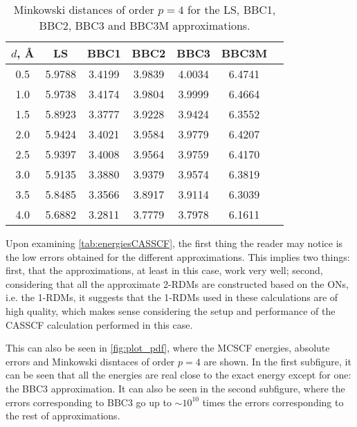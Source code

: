     \begin{table}[b!]
        \caption{Minkowski distances of order $p = 4$ for the LS, BBC1, BBC2, BBC3
        and BBC3M approximations.}
        \label{tab:minkowski}
        \centering
        \begin{tabular}{@{}ccccccc@{}}
            \toprule
            $d$, \AA    & LS       & BBC1     & BBC2     & BBC3     & BBC3M    \\
            \midrule
            0.5   & 5.9788   & 3.4199   & 3.9839   & 4.0034   & 6.4741   \\
            1.0   & 5.9738   & 3.4174   & 3.9804   & 3.9999   & 6.4664   \\
            1.5   & 5.8923   & 3.3777   & 3.9228   & 3.9424   & 6.3552   \\
            2.0   & 5.9424   & 3.4021   & 3.9584   & 3.9779   & 6.4207   \\
            2.5   & 5.9397   & 3.4008   & 3.9564   & 3.9759   & 6.4170   \\
            3.0   & 5.9135   & 3.3880   & 3.9379   & 3.9574   & 6.3819   \\
            3.5   & 5.8485   & 3.3566   & 3.8917   & 3.9114   & 6.3039   \\
            4.0   & 5.6882   & 3.2811   & 3.7779   & 3.7978   & 6.1611   \\
            \bottomrule
        \end{tabular}
    \end{table}

    Upon examining \cref{tab:energiesCASSCF}, the first thing the reader may notice
    is the low errors obtained for the different approximations.
    This implies two things: first, that the approximations, at least in this case,
    work very well; second, considering that all the approximate 2-RDMs are
    constructed based on the ONs, i.e. the 1-RDMs, it suggests that the 1-RDMs
    used in these calculations are of high quality, which makes sense considering
    the setup and performance of the CASSCF calculation performed in this case.

    This can also be seen in \cref{fig:plot_pdf}, where the MCSCF energies, absolute
    errors and Minkowski disntaces of order $p=4$ are shown.
    In the first subfigure, it can be seen that all the energies are real close to
    the exact energy except for one: the BBC3 approximation.
    It can also be seen in the second subfigure, where the errors corresponding
    to BBC3 go up to $\sim 10^{10}$ times the errors corresponding to the rest
    of approximations.

